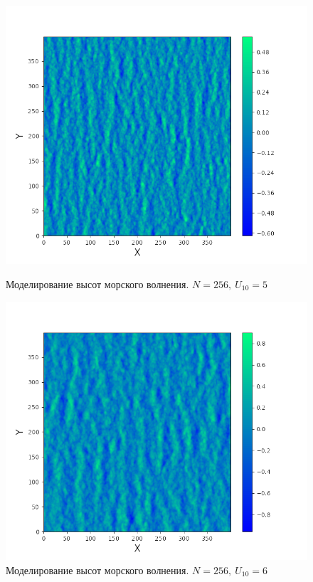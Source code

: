 \begin{figure}[H]
\begin{minipage}[h]{0.45\linewidth}
	\centering
	\includegraphics[width=\linewidth]{img/water5.png}
	\caption{Моделирование высот морского волнения. $N=256, ~ U_{10}=5$ }
	\label{fig:water5}
\end{minipage}
\hfill
\begin{minipage}[h]{0.45\linewidth}
	\centering
	\includegraphics[width=\linewidth]{img/water6.png}
	\caption{Моделирование высот морского волнения. $N=256, ~ U_{10}=6$ }
	\label{fig:water6}
\end{minipage}


\end{figure}
